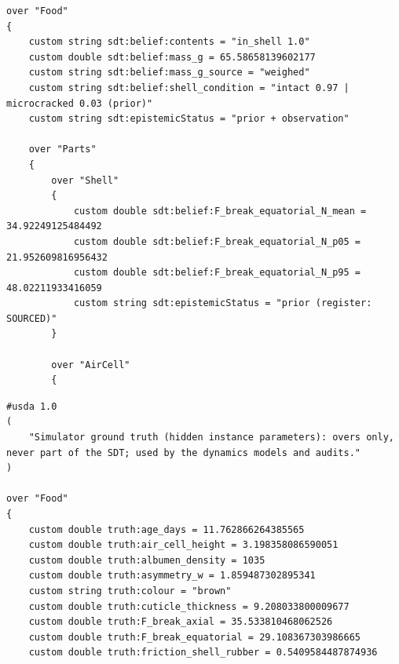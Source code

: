 \documentclass[10.5pt,a4paper]{article}
\begin{document}
\par\medskip{}\par\nopagebreak\vspace{2pt}\begin{Verbatim}[fontsize=\scriptsize,frame=lines,framesep=2mm,breaklines]
over "Food"
{
    custom string sdt:belief:contents = "in_shell 1.0"
    custom double sdt:belief:mass_g = 65.58658139602177
    custom string sdt:belief:mass_g_source = "weighed"
    custom string sdt:belief:shell_condition = "intact 0.97 | microcracked 0.03 (prior)"
    custom string sdt:epistemicStatus = "prior + observation"

    over "Parts"
    {
        over "Shell"
        {
            custom double sdt:belief:F_break_equatorial_N_mean = 34.92249125484492
            custom double sdt:belief:F_break_equatorial_N_p05 = 21.952609816956432
            custom double sdt:belief:F_break_equatorial_N_p95 = 48.02211933416059
            custom string sdt:epistemicStatus = "prior (register: SOURCED)"
        }

        over "AirCell"
        {
\end{Verbatim}
\par\medskip{}\par\nopagebreak\vspace{2pt}\begin{Verbatim}[fontsize=\scriptsize,frame=lines,framesep=2mm,breaklines]
#usda 1.0
(
    "Simulator ground truth (hidden instance parameters): overs only, never part of the SDT; used by the dynamics models and audits."
)

over "Food"
{
    custom double truth:age_days = 11.762866264385565
    custom double truth:air_cell_height = 3.198358086590051
    custom double truth:albumen_density = 1035
    custom double truth:asymmetry_w = 1.859487302895341
    custom string truth:colour = "brown"
    custom double truth:cuticle_thickness = 9.208033800009677
    custom double truth:F_break_axial = 35.533810468062526
    custom double truth:F_break_equatorial = 29.108367303986665
    custom double truth:friction_shell_rubber = 0.5409584487874936
\end{Verbatim}
\end{document}
